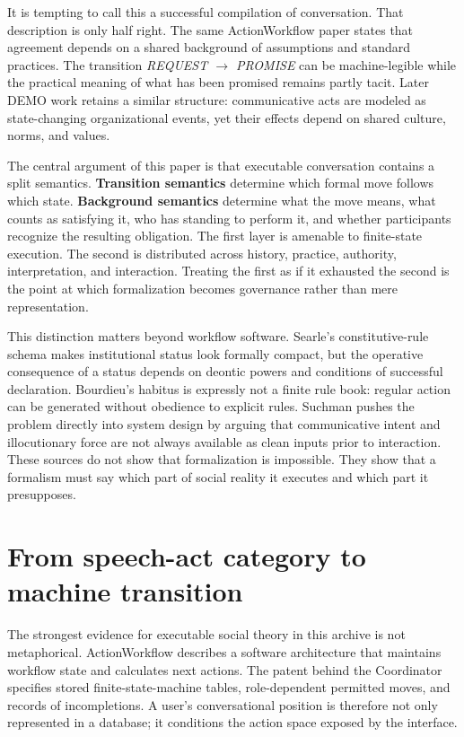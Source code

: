 \documentclass[11pt]{article}
\begin{document}
It is tempting to call this a successful compilation of conversation. That description is only half right. The same ActionWorkflow paper states that agreement depends on a shared background of assumptions and standard practices. The transition \emph{REQUEST $\rightarrow$ PROMISE} can be machine-legible while the practical meaning of what has been promised remains partly tacit. Later DEMO work retains a similar structure: communicative acts are modeled as state-changing organizational events, yet their effects depend on shared culture, norms, and values. \cite{medinamora1992actionworkflow,dietz1999demo}\par

The central argument of this paper is that executable conversation contains a split semantics. \textbf{Transition semantics} determine which formal move follows which state. \textbf{Background semantics} determine what the move means, what counts as satisfying it, who has standing to perform it, and whether participants recognize the resulting obligation. The first layer is amenable to finite-state execution. The second is distributed across history, practice, authority, interpretation, and interaction. Treating the first as if it exhausted the second is the point at which formalization becomes governance rather than mere representation.\par

This distinction matters beyond workflow software. Searle's constitutive-rule schema makes institutional status look formally compact, but the operative consequence of a status depends on deontic powers and conditions of successful declaration. Bourdieu's habitus is expressly not a finite rule book: regular action can be generated without obedience to explicit rules. Suchman pushes the problem directly into system design by arguing that communicative intent and illocutionary force are not always available as clean inputs prior to interaction. These sources do not show that formalization is impossible. They show that a formalism must say which part of social reality it executes and which part it presupposes. \cite{searle2018constitutive,bourdieu1977outline,suchman1993categories}\par

\section{From speech-act category to machine transition}

The strongest evidence for executable social theory in this archive is not metaphorical. ActionWorkflow describes a software architecture that maintains workflow state and calculates next actions. The patent behind the Coordinator specifies stored finite-state-machine tables, role-dependent permitted moves, and records of incompletions. A user's conversational position is therefore not only represented in a database; it conditions the action space exposed by the interface. \cite{medinamora1992actionworkflow,flores1993conversation}\par
\end{document}
